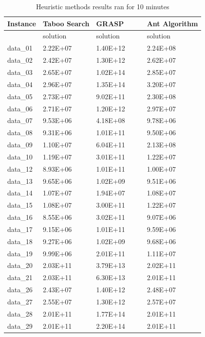 \begin{table}[]
\caption{Heuristic methods results ran for 10 minutes}
\begin{tabular}{llll}
\hline
Instance & \textbf{Taboo Search} & \textbf{GRASP $\qquad$} & \textbf{Ant Algorithm} \\ \hline
         & solution              & solution       & solution               \\ \hline
data\_01 & 2.22E+07              & 1.40E+12       & 2.24E+08               \\
data\_02 & 2.42E+07              & 1.30E+12       & 2.62E+07               \\
data\_03 & 2.65E+07              & 1.02E+14       & 2.85E+07               \\
data\_04 & 2.96E+07              & 1.35E+14       & 3.20E+07               \\
data\_05 & 2.73E+07              & 9.02E+11       & 2.30E+08               \\
data\_06 & 2.71E+07              & 1.20E+12       & 2.97E+07               \\
data\_07 & 9.53E+06              & 4.18E+08       & 9.78E+06               \\
data\_08 & 9.31E+06              & 1.01E+11       & 9.50E+06               \\
data\_09 & 1.10E+07              & 6.04E+11       & 2.13E+08               \\
data\_10 & 1.19E+07              & 3.01E+11       & 1.22E+07               \\
data\_12 & 8.93E+06              & 1.01E+11       & 1.00E+07               \\
data\_13 & 9.65E+06              & 1.02E+09       & 9.51E+06               \\
data\_14 & 1.07E+07              & 1.94E+07       & 1.08E+07               \\
data\_15 & 1.08E+07              & 3.00E+11       & 1.22E+07               \\
data\_16 & 8.55E+06              & 3.02E+11       & 9.07E+06               \\
data\_17 & 9.15E+06              & 1.01E+11       & 9.59E+06               \\
data\_18 & 9.27E+06              & 1.02E+09       & 9.68E+06               \\
data\_19 & 9.99E+06              & 2.01E+11       & 1.11E+07               \\
data\_20 & 2.03E+11              & 3.79E+13       & 2.02E+11               \\
data\_21 & 2.03E+11              & 6.30E+13       & 2.01E+11               \\
data\_26 & 2.43E+07              & 1.40E+12       & 2.48E+07               \\
data\_27 & 2.55E+07              & 1.30E+12       & 2.57E+07               \\
data\_28 & 2.01E+11              & 1.77E+14       & 2.01E+11               \\
data\_29 & 2.01E+11              & 2.20E+14       & 2.01E+11               \\ \hline
\end{tabular}
\end{table}